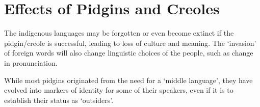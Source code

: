 \documentclass[../main.tex]{subfiles}
\begin{document}
    \section{Effects of Pidgins and Creoles}
    The indigenous languages may be forgotten or even become extinct if the pidgin/creole is successful, leading to loss of culture and meaning. The `invasion' of foreign words will also change linguistic choices of the people, such as change in pronunciation.

    While most pidgins originated from the need for a `middle language', they have evolved into markers of identity for some of their speakers, even if it is to establish their status as `outsiders'.
\end{document}
